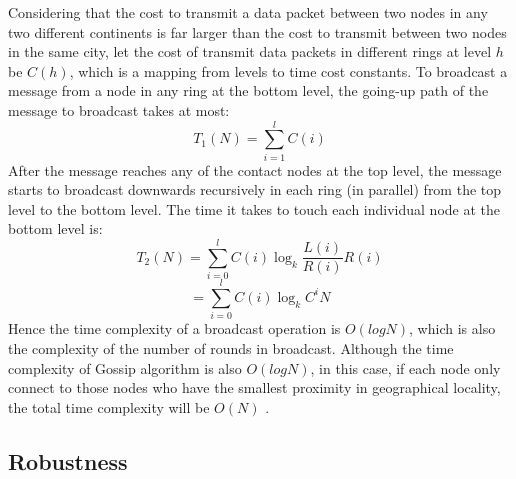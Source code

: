 Considering that the cost to transmit a data packet between two nodes in any two different continents is far larger than the cost to transmit between two nodes in the same city, let the cost of transmit data packets in different rings at level $h$ be $C(h)$, which is a mapping from levels to time cost constants. 
To broadcast a message from a node in any ring at the bottom level, the going-up path of the message to broadcast takes at most: $$T_1(N) = \sum_{i=1}^{l}C(i)$$
After the message reaches any of the contact nodes at the top level, the message starts to broadcast downwards recursively in each ring (in parallel) from the top level to the bottom level. The time it takes to touch each individual node at the bottom level is: $$T_2(N) = \sum_{i=0}^{l}C(i)\log_{k}{\frac{L(i)}{R(i)}}R(i)$$ $$= \sum_{i=0}^{l}C(i)\log_{k}{C^iN}$$
Hence the time complexity of a broadcast operation is $O(logN)$, which is also the complexity of the number of rounds in broadcast. Although the time complexity of Gossip algorithm is also $O(logN)$, in this case, if each node only connect to those nodes who have the smallest proximity in geographical locality, the total time complexity will be $O(N)$ \cite{kashyap2006efficient, kaune2008embracing}.

\subsection{Robustness}

